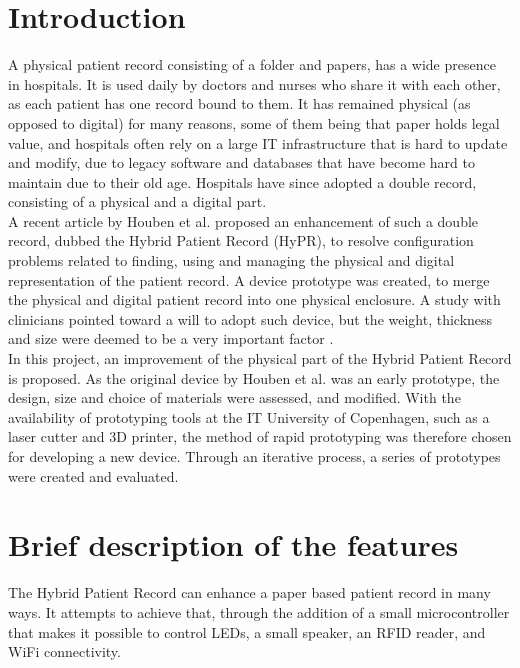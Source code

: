 \section{Introduction}

A physical patient record consisting of a folder and papers, has a wide presence in hospitals. It is used daily by doctors and nurses who share it with each other, as each patient has one record bound to them. It has remained physical (as opposed to digital) for many reasons, some of them being that paper holds legal value, and hospitals often rely on a large IT infrastructure that is hard to update and modify, due to legacy software and databases that have become hard to maintain due to their old age. Hospitals have since adopted a double record, consisting of a physical and a digital part. \\

A recent article by Houben et al. proposed an enhancement of such a double record, dubbed the Hybrid Patient Record (HyPR), to resolve configuration problems related to finding, using and managing the physical and digital representation of the patient record. A device prototype was created, to merge the physical and digital patient record
into one physical enclosure. A study with clinicians pointed toward a will to adopt such device, but the weight, thickness and size were deemed to be a very important factor \cite{hypr}. \\

In this project, an improvement of the physical part of the Hybrid Patient Record is proposed. As the original device by Houben et al. was an early prototype, the design, size and choice of materials were assessed, and modified. With the availability of prototyping tools at the IT University of Copenhagen, such as a laser cutter and 3D printer, the method of rapid prototyping was therefore chosen for developing a new device. Through an iterative process, a series of prototypes were created and evaluated. 

\clearpage

\section{Brief description of the features}

The Hybrid Patient Record can enhance a paper based patient record in many ways. It attempts to achieve that, through the addition of a small microcontroller that makes it possible to control LEDs, a small speaker, an RFID reader, and WiFi connectivity. \\

